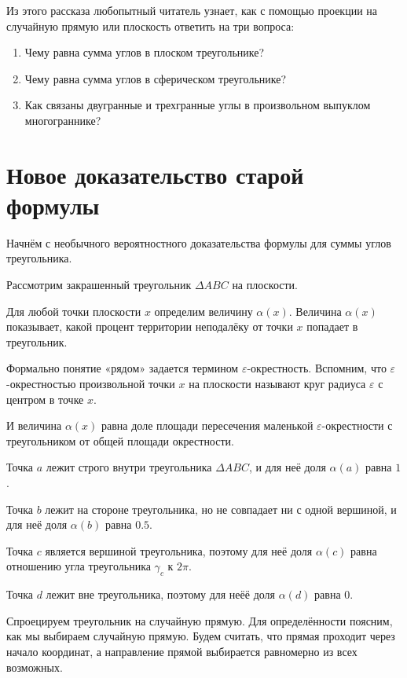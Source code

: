 \documentclass[12pt]{article} %
\theoremstyle{definition} %
\begin{document}
Из этого рассказа любопытный читатель узнает, как с помощью проекции на случайную прямую или плоскость ответить на три вопроса:

\begin{enumerate}
\item Чему равна сумма углов в плоском треугольнике?

\item Чему равна сумма углов в сферическом треугольнике?

\item Как связаны двугранные и трехгранные углы в произвольном выпуклом многограннике?
\end{enumerate}


\section{Новое доказательство старой формулы}

Начнём с необычного вероятностного доказательства формулы для суммы углов треугольника. 

Рассмотрим закрашенный треугольник $\Delta ABC$ на плоскости. 


Для любой точки плоскости $x$ определим величину $\alpha(x)$. 
Величина $\alpha(x)$ показывает, какой процент территории неподалёку от точки $x$ попадает в треугольник. 

Формально понятие «рядом» задается термином $\varepsilon$-окрестность. 
Вспомним, что $\varepsilon$-окрестностью произвольной точки $x$ на плоскости называют круг радиуса $\varepsilon$ с центром в точке $x$.

И величина $\alpha(x)$ равна доле площади пересечения маленькой $\varepsilon$-окрестности 
с треугольником от общей площади окрестности. 



Точка $a$ лежит строго внутри треугольника $\Delta ABC$, 
и для неё доля $\alpha(a)$ равна $1$.

Точка $b$ лежит на стороне треугольника, но не совпадает ни с одной вершиной, 
и для неё доля $\alpha(b)$ равна $0.5$.

Точка $c$ является вершиной треугольника, поэтому для неё доля $\alpha(c)$
равна отношению угла треугольника $\gamma_c$ к $2\pi$.

Точка $d$ лежит вне треугольника, поэтому для неёё доля $\alpha(d)$ равна $0$.


Спроецируем треугольник на случайную прямую. 
Для определённости поясним, как мы выбираем случайную прямую. 
Будем считать, что прямая проходит через начало координат, а направление прямой выбирается равномерно из всех возможных.
\end{document}

